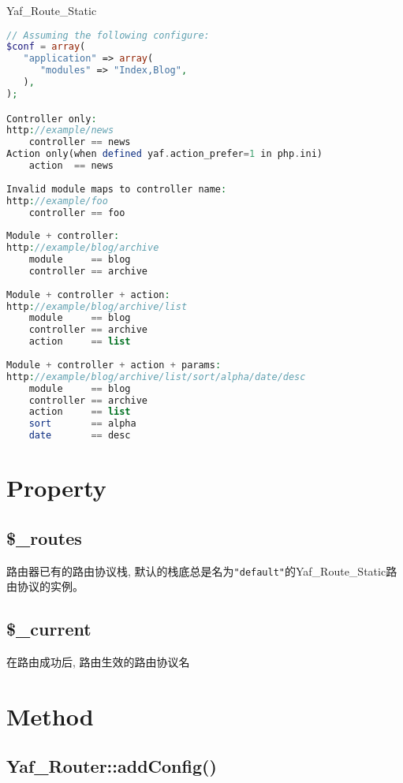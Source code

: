 \begin{example}
Yaf\_Route\_Static
\begin{lstlisting}[language=PHP]
// Assuming the following configure:
$conf = array(
   "application" => array(
      "modules" => "Index,Blog",
   ),
);

Controller only:
http://example/news
    controller == news
Action only(when defined yaf.action_prefer=1 in php.ini)
    action  == news
 
Invalid module maps to controller name:
http://example/foo
    controller == foo
 
Module + controller:
http://example/blog/archive
    module     == blog
    controller == archive
 
Module + controller + action:
http://example/blog/archive/list
    module     == blog
    controller == archive
    action     == list
 
Module + controller + action + params:
http://example/blog/archive/list/sort/alpha/date/desc
    module     == blog
    controller == archive
    action     == list
    sort       == alpha
    date       == desc
\end{lstlisting}
\end{example}


\section{Property}


\subsection{\$\_routes}

路由器已有的路由协议栈, 默认的栈底总是名为\texttt{"default"}的Yaf\_Route\_Static路由协议的实例。




\subsection{\$\_current}

在路由成功后, 路由生效的路由协议名


\section{Method}


\subsection{Yaf\_Router::addConfig()}

